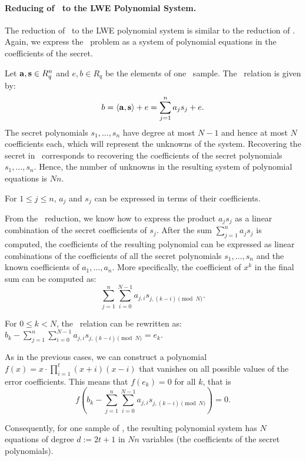 \paragraph{Reducing of \mlwe\ to the LWE Polynomial System.}
The reduction of \mlwe\ to the LWE polynomial system is similar to the reduction of \rlwe. Again, we express the \mlwe\ problem as a system of polynomial equations in the coefficients of the secret.

Let \(\mathbf{a}, \mathbf{s} \in R_q^n\) and \(e, b \in R_q\) be the elements of one \mlwe\ sample. The \mlwe\ relation is given by:
\[b = \langle \mathbf{a}, \mathbf{s} \rangle + e = \sum_{j=1}^n a_j s_j + e.\]
The secret polynomials \(s_1, \dots, s_n\) have degree at most \(N-1\) and hence at most \(N\) coefficients each, which will represent the unknowns of the system. Recovering the secret in \mlwe\ corresponds to recovering the coefficients of the secret polynomials \(s_1, \dots, s_n\). Hence, the number of unknowns in the resulting system of polynomial equations is \(Nn\).

For \(1 \le j \le n\), \(a_j\) and \(s_j\) can be expressed in terms of their coefficients.

From the \rlwe\ reduction, we know how to express the product \(a_j s_j\) as a linear combination of the secret coefficients of \(s_j\). After the sum \(\sum_{j=1}^n a_j s_j\) is computed, the coefficients of the resulting polynomial can be expressed as linear combinations of the coefficients of all the secret polynomials \(s_1, \dots, s_n\) and the known coefficients of \(a_1, \dots, a_n\). 
More specifically, the coefficient of \(x^k\) in the final sum can be computed as:
\[\sum_{j=1}^n \sum_{i=0}^{N-1} a_{j,i} s_{j,(k-i) \pmod N}.\]

For \(0 \le k < N\), the \mlwe\ relation can be rewritten as: $b_k - \sum_{j=1}^n \sum_{i=0}^{N-1} a_{j,i} s_{j,(k-i) \pmod N} = e_k.$

As in the previous cases, we can construct a polynomial \(f(x) = x \cdot \prod_{i=1}^{t} (x+i)(x-i)\) that vanishes on all possible values of the error coefficients. This means that \(f(e_k) = 0\) for all \(k\), that is \[f\left(b_k - \sum_{j=1}^n \sum_{i=0}^{N-1} a_{j,i} s_{j,(k-i) \pmod N}\right) = 0.\]

Consequently, for one sample of \mlwe, the resulting polynomial system has \(N\) equations of degree \(d := 2t+1\) in \(Nn\) variables (the coefficients of the secret polynomials).
